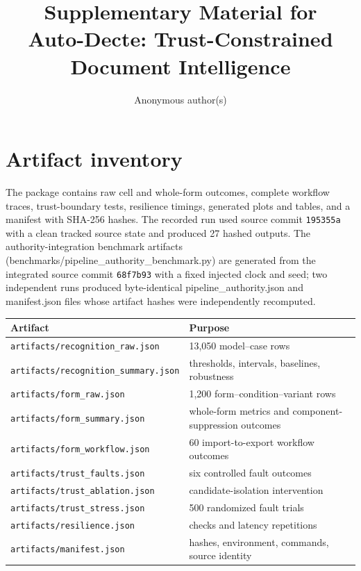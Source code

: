 \documentclass[10pt]{article}
\title{Supplementary Material for\\Auto-Decte: Trust-Constrained Document Intelligence}
\author{Anonymous author(s)}
\date{}
\begin{document}
\maketitle

\section{Artifact inventory}
The package contains raw cell and whole-form outcomes, complete workflow traces, trust-boundary tests, resilience timings, generated plots and tables, and a manifest with SHA-256 hashes. The recorded run used source commit \texttt{195355a} with a clean tracked source state and produced 27 hashed outputs. The authority-integration benchmark artifacts (benchmarks/pipeline\_authority\_benchmark.py) are generated from the integrated source commit \texttt{68f7b93} with a fixed injected clock and seed; two independent runs produced byte-identical pipeline\_authority.json and manifest.json files whose artifact hashes were independently recomputed.

\begin{center}
\begin{tabular}{ll}
\toprule
Artifact & Purpose \\
\midrule
\texttt{artifacts/recognition\_raw.json} & 13,050 model--case rows \\
\texttt{artifacts/recognition\_summary.json} & thresholds, intervals, baselines, robustness \\
\texttt{artifacts/form\_raw.json} & 1,200 form--condition--variant rows \\
\texttt{artifacts/form\_summary.json} & whole-form metrics and component-suppression outcomes \\
\texttt{artifacts/form\_workflow.json} & 60 import-to-export workflow outcomes \\
\texttt{artifacts/trust\_faults.json} & six controlled fault outcomes \\
\texttt{artifacts/trust\_ablation.json} & candidate-isolation intervention \\
\texttt{artifacts/trust\_stress.json} & 500 randomized fault trials \\
\texttt{artifacts/resilience.json} & checks and latency repetitions \\
\texttt{artifacts/manifest.json} & hashes, environment, commands, source identity \\
\bottomrule
\end{tabular}
\end{center}
\end{document}
